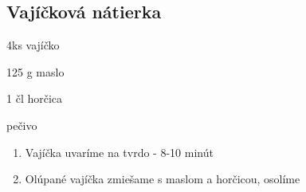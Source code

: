\setcounter{step}{0}
\subsection{Vajíčková nátierka}

\begin{ingredient}
\def\portions{4}%

\begin{main}
	\item 4ks vajíčko
	\item 125 g maslo
	\item 1 čl horčica
  \item pečivo
\end{main}
\end{ingredient}
\begin{recipe}

\begin{enumerate}

\item{Vajíčka uvaríme na tvrdo - 8-10 minút}
\item{Olúpané vajíčka zmiešame s maslom a horčicou, osolíme}

\end{enumerate}
\end{recipe}

\begin{notes}

\end{notes}
\clearpage	
